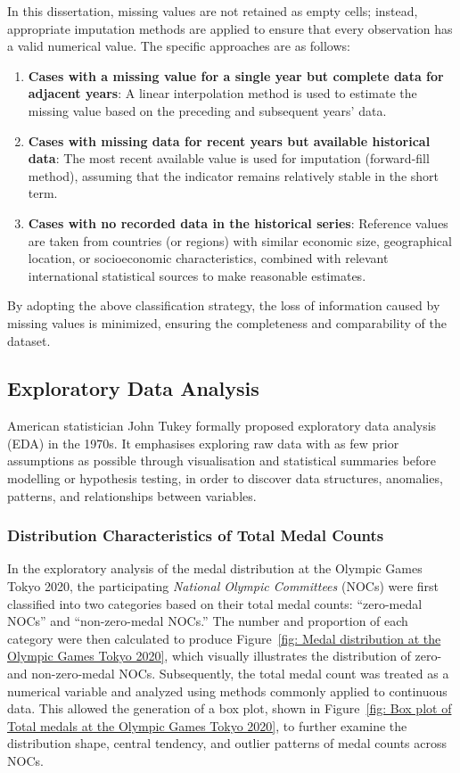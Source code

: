 \documentclass[11pt,twoside]{article}
\numberwithin{Theorem}{section}
\numberwithin{Definition}{section}
\numberwithin{Lemma}{section}
\numberwithin{Algorithm}{section}
\numberwithin{equation}{section}
\begin{document}
In this dissertation, missing values are not retained as empty cells; instead, appropriate imputation methods are applied to ensure that every observation has a valid numerical value. The specific approaches are as follows:  
\begin{enumerate}
    \item \textbf{Cases with a missing value for a single year but complete data for adjacent years}: A linear interpolation method is used to estimate the missing value based on the preceding and subsequent years' data.
    \item \textbf{Cases with missing data for recent years but available historical data}: The most recent available value is used for imputation (forward-fill method), assuming that the indicator remains relatively stable in the short term.
    \item \textbf{Cases with no recorded data in the historical series}: Reference values are taken from countries (or regions) with similar economic size, geographical location, or socioeconomic characteristics, combined with relevant international statistical sources to make reasonable estimates.
\end{enumerate}
By adopting the above classification strategy, the loss of information caused by missing values is minimized, ensuring the completeness and comparability of the dataset.

\subsection{Exploratory Data Analysis}
American statistician John Tukey formally proposed exploratory data analysis (EDA) \cite{tukey1962}in the 1970s. It emphasises exploring raw data with as few prior assumptions as possible through visualisation and statistical summaries before modelling or hypothesis testing, in order to discover data structures, anomalies, patterns, and relationships between variables.

\subsubsection{Distribution Characteristics of Total Medal Counts}

In the exploratory analysis of the medal distribution at the Olympic Games Tokyo 2020, the participating \textit{National Olympic Committees} (NOCs) were first classified into two categories based on their total medal counts: ``zero-medal NOCs'' and ``non-zero-medal NOCs.'' The number and proportion of each category were then calculated to produce Figure~\ref{fig: Medal distribution at the Olympic Games Tokyo 2020}, which visually illustrates the distribution of zero- and non-zero-medal NOCs. Subsequently, the total medal count was treated as a numerical variable and analyzed using methods commonly applied to continuous data. This allowed the generation of a box plot, shown in Figure~\ref{fig: Box plot of Total medals at the Olympic Games Tokyo 2020}, to further examine the distribution shape, central tendency, and outlier patterns of medal counts across NOCs.
\end{document}
